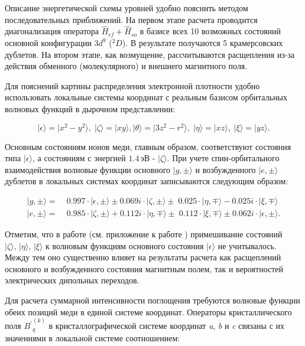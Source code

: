 Описание энергетической схемы уровней удобно пояснить методом последовательных приближений. На первом этапе расчета проводится диагонализация оператора \(\hat{H}_{cf}+\hat{H}_{so}\) в базисе всех 10 возможных состояний основной конфигурации $3d^9$ ($^{2}D$). В результате получаются 5 крамерсовских дублетов. На втором этапе, как возмущение, рассчитываются расщепления из-за действия обменного (молекулярного) и внешнего магнитного поля.

Для пояснений картины распределения электронной плотности удобно использовать локальные системы координат с реальным базисом орбитальных волновых функций в дырочном представлении:

\begin{equation}
	\label{eq:BasisFunctions}
	| \epsilon \rangle  = | x^2-y^2 \rangle, \; | \zeta \rangle = | xy \rangle,
	| \theta \rangle  = | 3z^2-r^2 \rangle, \; | \eta \rangle = | xz \rangle, \; | \xi \rangle = | yz \rangle.
\end{equation}

Основным состояниям ионов меди, главным образом, соответствуют состояния типа $| \epsilon \rangle$, а состояниям с энергией $1.4\,эВ$ - $| \zeta \rangle$. При учете спин-орбитального взаимодействия волновые функции основного $| g,\pm \rangle$ и возбужденного $| e,\pm \rangle$ дублетов в локальных системах координат записываются следующим образом:

\begin{equation}
	\label{eq:WaveFunctions}
	\begin{aligned}
		| g,\pm \rangle  = & \; 0.997 \cdot | \epsilon,\pm \rangle \pm 0.069i \cdot | \zeta,\pm \rangle \pm \; 0.025 \cdot | \eta,\mp \rangle - 0.025i \cdot | \xi,\mp \rangle \\
		| e,\pm \rangle = & \; 0.985 \cdot | \zeta,\pm \rangle + 0.112i \cdot | \eta,\mp \rangle	\pm \; 0.112 \cdot | \xi,\mp \rangle \pm 0.062i \cdot | \epsilon,\pm \rangle.
	\end{aligned}
\end{equation}

Отметим, что в работе \cite{Toyoda2015} (см. приложение к работе \cite{Toyoda2015}) примешивание состояний $|\zeta\rangle, \, |\eta\rangle, \, |\xi\rangle$ к волновым функциям основного состояния $|\epsilon\rangle$ не учитывалось. Между тем оно существенно влияет на результаты расчета как расщеплений основного и возбужденного состояния магнитным полем, так и вероятностей электрических дипольных переходов.

Для расчета суммарной интенсивности поглощения требуются волновые функции обеих позиций меди в единой системе координат. Операторы кристаллического поля ${B^\prime}_q^{(k)}$ в кристаллографической системе координат \textit{a}, \textit{b} и \textit{c} связаны с их значениями в локальной системе соотношением:


